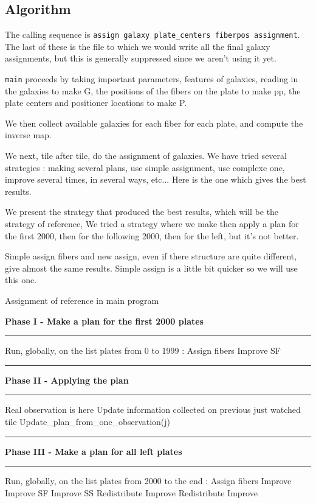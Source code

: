 \documentclass{extarticle}
\newcommand\Algphasee[1]{%
\Statex\hspace*{-\algorithmicindent}\textbf{#1}%
\vspace*{-.7\baselineskip}\Statex\hspace*{\dimexpr-\algorithmicindent-2pt\relax}\rule{\linewidth}{0.4pt}%
}
\newcommand\Algphase[1]{%
\vspace*{-.7\baselineskip}\Statex\hspace*{\dimexpr-\algorithmicindent-2pt\relax}\rule{\linewidth}{0.4pt}%
\Statex\hspace*{-\algorithmicindent}\textbf{#1}%
\vspace*{-.7\baselineskip}\Statex\hspace*{\dimexpr-\algorithmicindent-2pt\relax}\rule{\linewidth}{0.4pt}%
}
\begin{document}
\begin{multicols}{2}
\section{Algorithm}

The calling sequence is {\tt assign galaxy plate\_centers fiberpos assignment}. The last of these is the file to which we would write all the final galaxy assignments, but this is generally suppressed since we aren't using it yet.

 {\tt main} proceeds by taking important parameters, features of galaxies, reading in the galaxies to make G, the positions of the fibers on the plate to make pp, the plate centers and positioner locations to make P. 
 
We then collect available galaxies for each fiber for each plate, and compute the inverse map.
 
We next, tile after tile, do the assignment of galaxies. We have tried several strategies : making several plans, use simple assignment, use complexe one, improve several times, in several ways, etc... Here is the one which gives the best results.

We present the strategy that produced the best results, which will be the strategy of reference,
We tried a strategy where we make then apply a plan for the first 2000, then for the following 2000, then for the left, but it's not better.

Simple assign fibers and new assign, even if there structure are quite different, give almost the same results. Simple assign is a little bit quicker so we will use this one.

\begin{algorithm}[H]
	\caption{Assignment of reference in main program}\label{euclid}
	\begin{algorithmic}[1]
		\Algphasee{Phase I - Make a plan for the first 2000 plates}
		\State Run, globally, on the list plates from 0 to 1999 :
		\State Assign fibers
		\State Improve SF
	\end{algorithmic}
	\begin{algorithmic}[1]
		\Algphase{Phase II - Applying the plan}
		\State Real observation is here
		\State Update information collected on previous just watched tile
		\State Update\_plan\_from\_one\_observation(j)
		\EndFor
	\end{algorithmic}

	\begin{algorithmic}[1]
		\Algphase{Phase III - Make a plan for all left plates}
		\State Run, globally, on the list plates from 2000 to the end :
		\State Assign fibers
		\State Improve
		\State Improve SF
		\State Improve SS
		\State Redistribute
		\State Improve
		\State Redistribute
		\State Improve
	\end{algorithmic}


\end{algorithm}
\end{multicols}
\end{document}
